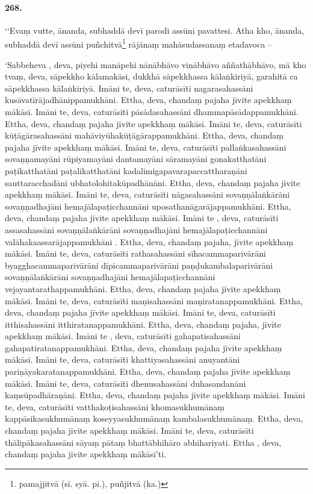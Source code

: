\paragraph{268.} ‘‘Evaṃ vutte, ānanda, subhaddā devī parodi assūni pavattesi. Atha kho, ānanda, subhaddā devī assūni puñchitvā\footnote{pamajjitvā (sī. syā. pī.), puñjitvā (ka.)} rājānaṃ mahāsudassanaṃ etadavoca –

‘Sabbeheva , deva, piyehi manāpehi nānābhāvo vinābhāvo aññathābhāvo, mā kho tvaṃ, deva, sāpekkho kālamakāsi, dukkhā sāpekkhassa kālaṅkiriyā, garahitā ca sāpekkhassa kālaṅkiriyā. Imāni te, deva, caturāsīti nagarasahassāni kusāvatīrājadhānippamukhāni. Ettha, deva, chandaṃ pajaha jīvite apekkhaṃ mākāsi. Imāni te, deva, caturāsīti pāsādasahassāni dhammapāsādappamukhāni. Ettha, deva, chandaṃ pajaha jīvite apekkhaṃ mākāsi. Imāni te, deva, caturāsīti kūṭāgārasahassāni mahāviyūhakūṭāgārappamukhāni. Ettha, deva, chandaṃ pajaha jīvite apekkhaṃ mākāsi. Imāni te, deva, caturāsīti pallaṅkasahassāni sovaṇṇamayāni rūpiyamayāni dantamayāni sāramayāni gonakatthatāni paṭikatthatāni paṭalikatthatāni kadalimigapavarapaccattharaṇāni sauttaracchadāni ubhatolohitakūpadhānāni. Ettha, deva, chandaṃ pajaha jīvite apekkhaṃ mākāsi. Imāni te, deva, caturāsīti nāgasahassāni sovaṇṇālaṅkārāni sovaṇṇadhajāni hemajālapaṭicchannāni uposathanāgarājappamukhāni. Ettha, deva, chandaṃ pajaha jīvite apekkhaṃ mākāsi. Imāni te , deva, caturāsīti assasahassāni sovaṇṇālaṅkārāni sovaṇṇadhajāni hemajālapaṭicchannāni valāhakaassarājappamukhāni . Ettha, deva, chandaṃ pajaha, jīvite apekkhaṃ mākāsi. Imāni te, deva, caturāsīti rathasahassāni sīhacammaparivārāni byagghacammaparivārāni dīpicammaparivārāni paṇḍukambalaparivārāni sovaṇṇālaṅkārāni sovaṇṇadhajāni hemajālapaṭicchannāni vejayantarathappamukhāni. Ettha, deva, chandaṃ pajaha jīvite apekkhaṃ mākāsi. Imāni te, deva, caturāsīti maṇisahassāni maṇiratanappamukhāni. Ettha, deva, chandaṃ pajaha jīvite apekkhaṃ mākāsi. Imāni te, deva, caturāsīti itthisahassāni itthiratanappamukhāni. Ettha, deva, chandaṃ pajaha, jīvite apekkhaṃ mākāsi. Imāni te , deva, caturāsīti gahapatisahassāni gahapatiratanappamukhāni. Ettha, deva, chandaṃ pajaha jīvite apekkhaṃ mākāsi. Imāni te, deva, caturāsīti khattiyasahassāni anuyantāni pariṇāyakaratanappamukhāni. Ettha, deva, chandaṃ pajaha jīvite apekkhaṃ mākāsi. Imāni te, deva, caturāsīti dhenusahassāni duhasandanāni kaṃsūpadhāraṇāni. Ettha, deva, chandaṃ pajaha jīvite apekkhaṃ mākāsi. Imāni te, deva, caturāsīti vatthakoṭisahassāni khomasukhumānaṃ kappāsikasukhumānaṃ koseyyasukhumānaṃ kambalasukhumānaṃ. Ettha, deva, chandaṃ pajaha jīvite apekkhaṃ mākāsi. Imāni te, deva, caturāsīti thālipākasahassāni sāyaṃ pātaṃ bhattābhihāro abhihariyati. Ettha , deva, chandaṃ pajaha jīvite apekkhaṃ mākāsī’ti.

